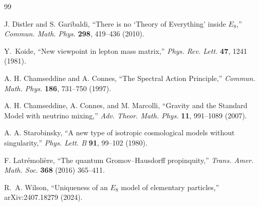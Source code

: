 \documentclass[12pt,a4paper]{article}
\theoremstyle{definition}
\begin{document}
\begin{thebibliography}{99}

J. Distler and S. Garibaldi, ``There is no `Theory of Everything' inside $E_8$,'' \textit{Commun. Math. Phys.} \textbf{298}, 419--436 (2010).

Y.~Koide, ``New viewpoint in lepton mass matrix,'' \textit{Phys. Rev. Lett.} \textbf{47}, 1241 (1981).

A. H. Chamseddine and A. Connes, ``The Spectral Action Principle,'' \textit{Commun. Math. Phys.} \textbf{186}, 731--750 (1997).

A. H. Chamseddine, A. Connes, and M. Marcolli, ``Gravity and the Standard Model with neutrino mixing,'' \textit{Adv. Theor. Math. Phys.} \textbf{11}, 991--1089 (2007).

A. A. Starobinsky, ``A new type of isotropic cosmological models without singularity,'' \textit{Phys. Lett. B} \textbf{91}, 99--102 (1980).

F. Latr\'emoli\`ere, ``The quantum Gromov--Hausdorff propinquity,'' \textit{Trans. Amer. Math. Soc.} \textbf{368} (2016) 365--411.

R.~A. Wilson, ``Uniqueness of an $E_8$ model of elementary particles,'' arXiv:2407.18279 (2024).

\end{thebibliography}
\end{document}

